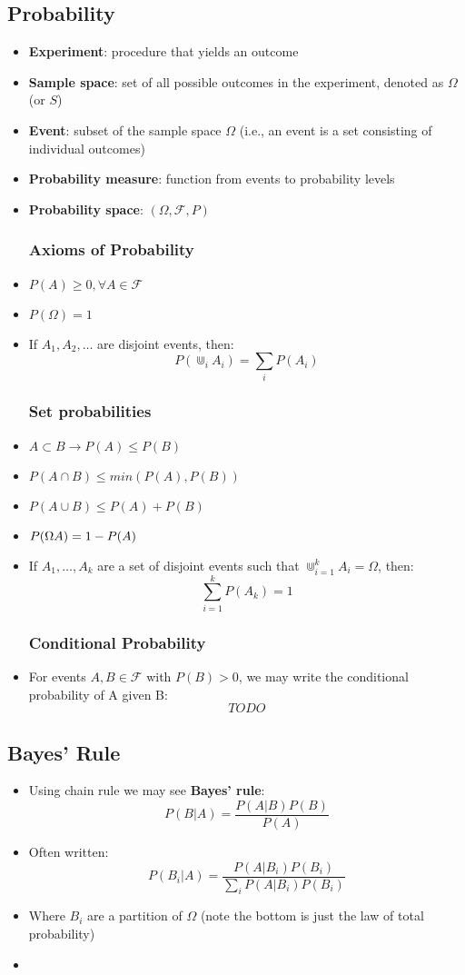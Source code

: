 \subsection{Probability}
\begin{itemize}
	\item \textbf{Experiment}: procedure that yields an outcome
	\item \textbf{Sample space}: set of all possible outcomes in the experiment, denoted as $\Omega$ (or $S$)
	\item \textbf{Event}: subset of the sample space $\Omega$ (i.e., an event is a set consisting of individual outcomes)
	\item \textbf{Probability measure}: function from events to probability levels
	\item \textbf{Probability space}: $(\Omega, \mathcal{F}, P)$
	\subsubsection{Axioms of Probability}
	\item $P(A)\geq 0, \forall A\in\mathcal{F}$
	\item $P(\Omega)=1$
	\item If $A_1, A_2, \ldots$ are disjoint events, then:
		$$P(\Cup_i A_i)=\sum_{i}P(A_i)$$
	\subsubsection{Set probabilities}
	\item $A\subset B \to P(A)\leq P(B)$
	\item $P(A\cap B)\leq min(P(A), P(B))$
	\item $P(A\cup B)\leq P(A) + P(B)$
	\item $P(\Omega\\A) = 1-P(A)$
	\item If $A_1,\ldots,A_k$ are a set of disjoint events such that $\Cup_{i=1}^k A_i=\Omega$, then: 
		$$\sum_{i=1}^k P(A_k)=1$$
	\subsubsection{Conditional Probability}
	\item For events $A, B\in\mathcal{F}$ with $P(B)>0$, we may write the conditional probability of A given B:
		$$TODO$$
\end{itemize}

\subsection{Bayes' Rule}
\begin{itemize}
	\item Using chain rule we may see \textbf{Bayes' rule}:
		$$P(B|A)=\frac{P(A|B)P(B)}{P(A)}$$
	\item Often written:
		$$P(B_i | A)=\frac{P(A|B_i) P(B_i)}{\sum_i P(A|B_i) P(B_i)}$$
	\item Where $B_i$ are a partition of $\Omega$ (note the bottom is just the law of total probability)
	\item 
\end{itemize}

